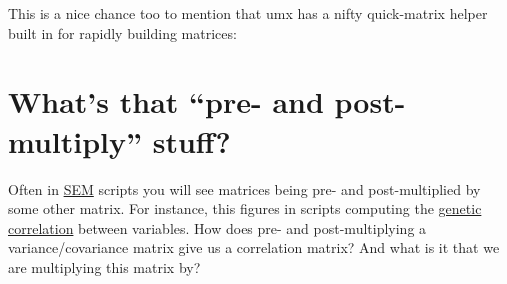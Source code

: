 \documentclass[11pt,]{article}
\newenvironment{Shaded}{\begin{snugshade}}{\end{snugshade}}
\newcommand{\KeywordTok}[1]{\textcolor[rgb]{0.13,0.29,0.53}{\textbf{#1}}}
\newcommand{\DecValTok}[1]{\textcolor[rgb]{0.00,0.00,0.81}{#1}}
\newcommand{\StringTok}[1]{\textcolor[rgb]{0.31,0.60,0.02}{#1}}
\newcommand{\OperatorTok}[1]{\textcolor[rgb]{0.81,0.36,0.00}{\textbf{#1}}}
\newcommand{\NormalTok}[1]{#1}
\begin{document}
\begin{Shaded}
\end{Shaded}

This is a nice chance too to mention that umx has a nifty quick-matrix
helper built in for rapidly building matrices:

\begin{Shaded}
\end{Shaded}

\section{\texorpdfstring{What's that ``pre- and post-multiply''
stuff?}{What's that pre- and post-multiply stuff?}}\label{whats-that-pre--and-post-multiply-stuff}

Often in
\href{https://en.wikipedia.org/wiki/Structural_equation_modeling}{SEM}
scripts you will see matrices being pre- and post-multiplied by some
other matrix. For instance, this figures in scripts computing the
\href{https://en.wikipedia.org/wiki/Genetic_correlation}{genetic
correlation} between variables. How does pre- and post-multiplying a
variance/covariance matrix give us a correlation matrix? And what is it
that we are multiplying this matrix by?
\end{document}
